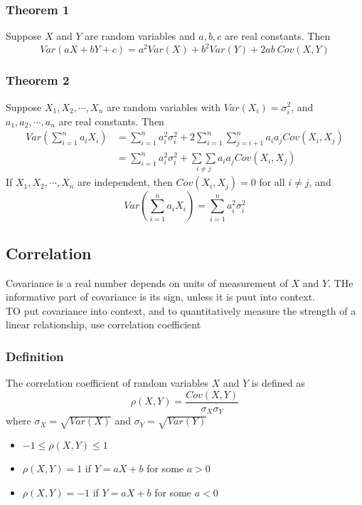 \documentclass[11pt]{article}
\begin{document}
\subsubsection*{Theorem 1}
Suppose $X$ and $Y$ are random variables and $a,b,c$ are real constants. Then 
\[Var(aX+bY+c)=a^2Var(X)+b^2Var(Y)+2ab\ Cov(X,Y)\]
\subsubsection*{Theorem 2}
Suppose $X_1,X_2,\cdots,X_n$ are random variables with $Var(X_i)=\sigma_i^2$, and $a_1,a_2,\cdots,a_n$ are real constants. Then 
\begin{align*}
    Var(\sum_{i=1}^{n}a_iX_i) &= \sum_{i=1}^{n}a_i^2\sigma_i^2 + 2\sum_{i=1}^{n}\sum_{j=i+1}^{n}a_ia_jCov(X_i,X_j) \\
                               &= \sum_{i=1}^{n}a_i^2\sigma_i^2 + \underset{i\neq j}{\sum\sum} a_ia_jCov(X_i,X_j)
\end{align*}
If $X_1,X_2,\cdots,X_n$ are independent, then $Cov(X_i,X_j)=0$ for all $i\neq j$, and
\[Var(\sum_{i=1}^{n}a_iX_i)=\sum_{i=1}^{n}a_i^2\sigma_i^2\]
\subsection{Correlation}
Covariance is a real number depends on units of measurement of $X$ and $Y$. THe informative part of covariance is its sign, unless it is puut into context. \\
TO put covariance into context, and to quantitatively measure the strength of a linear relationship, use correlation coefficient 
\subsubsection{Definition}
The correlation coefficient of random variables $X$ and $Y$ is defined as
\[\rho(X,Y)=\frac{Cov(X,Y)}{\sigma_X\sigma_Y}\]
where $\sigma_X=\sqrt{Var(X)}$ and $\sigma_Y=\sqrt{Var(Y)}$
\begin{itemize}
    \item $-1\leq\rho(X,Y)\leq1$
    \item $\rho(X,Y)=1$ if $Y=aX+b$ for some $a>0$
    \item $\rho(X,Y)=-1$ if $Y=aX+b$ for some $a<0$
\end{itemize}
\end{document}
